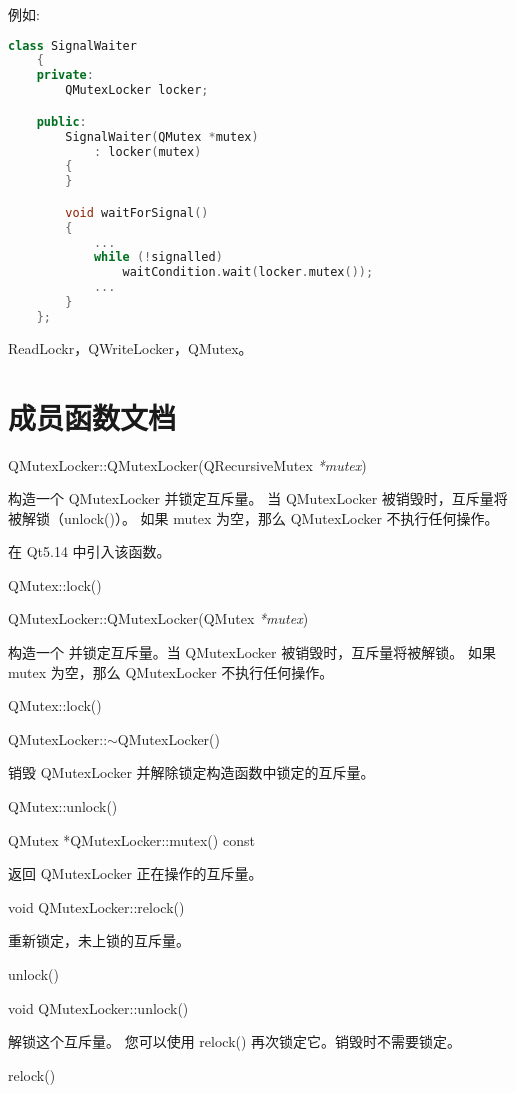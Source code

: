 例如:

\begin{lstlisting}[language=C++]
    class SignalWaiter
    {
    private:
        QMutexLocker locker;

    public:
        SignalWaiter(QMutex *mutex)
            : locker(mutex)
        {
        }

        void waitForSignal()
        {
            ...
            while (!signalled)
                waitCondition.wait(locker.mutex());
            ...
        }
    };
\end{lstlisting}

\begin{seeAlso}
ReadLockr，QWriteLocker，QMutex。
\end{seeAlso}


\section{成员函数文档}

QMutexLocker::QMutexLocker(QRecursiveMutex \emph{*mutex})

构造一个 QMutexLocker 并锁定互斥量。
当 QMutexLocker 被销毁时，互斥量将被解锁（unlock()）。
如果 mutex 为空，那么 QMutexLocker 不执行任何操作。

在 Qt5.14 中引入该函数。

\begin{seeAlso}
QMutex::lock()
\end{seeAlso}

QMutexLocker::QMutexLocker(QMutex \emph{*mutex})

构造一个 并锁定互斥量。当 QMutexLocker 被销毁时，互斥量将被解锁。
如果 mutex 为空，那么 QMutexLocker 不执行任何操作。

\begin{seeAlso}
QMutex::lock()
\end{seeAlso}

QMutexLocker::$\sim$QMutexLocker()

销毁 QMutexLocker 并解除锁定构造函数中锁定的互斥量。

\begin{seeAlso}
QMutex::unlock()
\end{seeAlso}

QMutex *QMutexLocker::mutex() const

返回 QMutexLocker 正在操作的互斥量。

void QMutexLocker::relock()

重新锁定，未上锁的互斥量。

\begin{seeAlso}
unlock()
\end{seeAlso}

void QMutexLocker::unlock()

解锁这个互斥量。
您可以使用 relock() 再次锁定它。销毁时不需要锁定。

\begin{seeAlso}
relock()
\end{seeAlso}